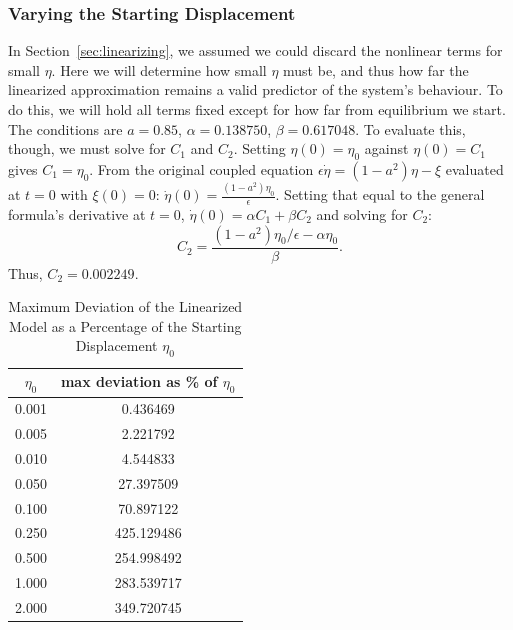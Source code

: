     \subsubsection{Varying the Starting Displacement}\label{subsubsec:varying-starting-displacement}

    In Section~\ref{sec:linearizing}, we assumed we could discard the nonlinear terms for small $\eta$. Here we will determine how small $\eta$ must be, and thus how far the linearized approximation remains a valid predictor of the system's behaviour. To do this, we will hold all terms fixed except for how far from equilibrium we start. The conditions are $a=0.85$, $\alpha=0.138750$, $\beta=0.617048$. To evaluate this, though, we must solve for $C_1$ and $C_2$. Setting $\eta(0)=\eta_0$ against $\eta(0)=C_1$ gives $C_1=\eta_0$. From the original coupled equation $\epsilon\dot\eta=(1-a^2)\eta-\xi$ evaluated at $t=0$ with $\xi(0)=0$: $\dot\eta(0)=\frac{\left(1-a^2\right)\eta_0}{\epsilon}$. Setting that equal to the general formula's derivative at $t=0$, $\dot\eta(0)=\alpha C_1+\beta C_2$ and solving for $C_2$:
    \[
        C_2=\frac{\left(1-a^2\right)\eta_0/\epsilon-\alpha\eta_0}{\beta}.
    \]
    Thus, $C_2=0.002249$.

    \begin{table}[H]
        \centering
        \begin{tabular}{cc}
            \toprule
            \textbf{$\eta_0$} & \textbf{max deviation as \% of $\eta_0$} \\
            \midrule
            0.001 & 0.436469   \\
            0.005 & 2.221792   \\
            0.010 & 4.544833   \\
            0.050 & 27.397509  \\
            0.100 & 70.897122  \\
            0.250 & 425.129486 \\
            0.500 & 254.998492 \\
            1.000 & 283.539717 \\
            2.000 & 349.720745 \\
            \bottomrule
        \end{tabular}
        \caption{Maximum Deviation of the Linearized Model as a Percentage of the Starting Displacement $\eta_0$}
        \label{tab:starting-displacement}
    \end{table}
    
